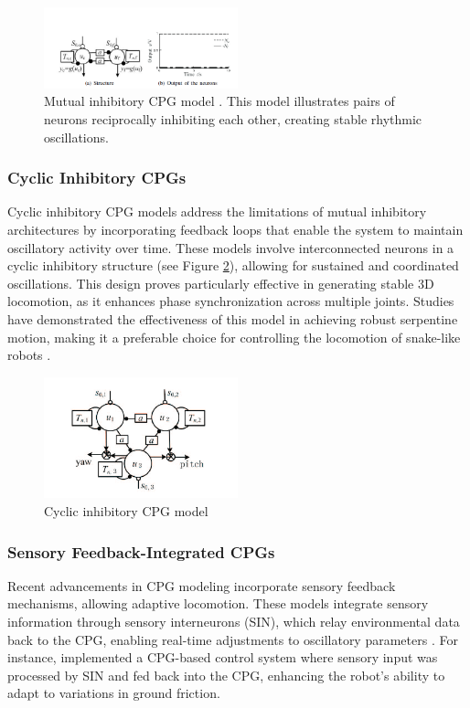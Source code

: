 \documentclass[12pt,a4paper]{report}
\begin{document}
\begin{figure}[H]
\centering
\includegraphics[width=0.5\textwidth]{media/MI_CPG.png}
\caption{Mutual inhibitory CPG model \cite{Lu2006}. This model illustrates pairs of neurons reciprocally inhibiting each other, creating stable rhythmic oscillations.}
\label{fig:mutual_inhibitory_cpg}
\end{figure}

\subsubsection{Cyclic Inhibitory CPGs}

Cyclic inhibitory CPG models address the limitations of mutual inhibitory architectures by incorporating feedback loops that enable the system to maintain oscillatory activity over time. These models involve interconnected neurons in a cyclic inhibitory structure (see Figure \ref{fig:cyclic_inhibitory_cpg}), allowing for sustained and coordinated oscillations. This design proves particularly effective in generating stable 3D locomotion, as it enhances phase synchronization across multiple joints. Studies have demonstrated the effectiveness of this model in achieving robust serpentine motion, making it a preferable choice for controlling the locomotion of snake-like robots \cite{Lu2006}.

\begin{figure}[H]
\centering
\includegraphics[width=0.5\textwidth]{media/CI_CPG.png}
\caption{Cyclic inhibitory CPG model \cite{Lu2006}}
\label{fig:cyclic_inhibitory_cpg}
\end{figure}

\subsubsection{Sensory Feedback-Integrated CPGs}
Recent advancements in CPG modeling incorporate sensory feedback mechanisms, allowing adaptive locomotion. These models integrate sensory information through sensory interneurons (SIN), which relay environmental data back to the CPG, enabling real-time adjustments to oscillatory parameters \cite{Inoue2007}. For instance, \textcite{Inoue2007} implemented a CPG-based control system where sensory input was processed by SIN and fed back into the CPG, enhancing the robot's ability to adapt to variations in ground friction.
\end{document}
